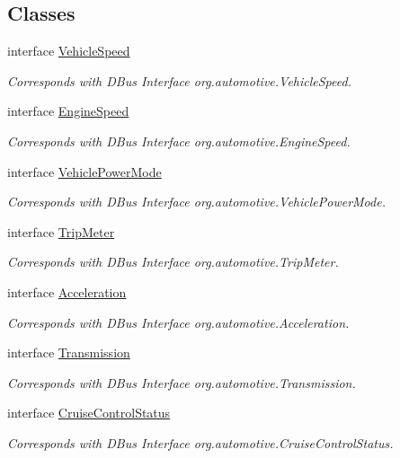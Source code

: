 \subsection*{Classes}
\begin{DoxyCompactItemize}
\item 
interface \hyperlink{interfaceVehicleSpeed}{Vehicle\+Speed}
\begin{DoxyCompactList}\small\item\em Corresponds with D\+Bus Interface org.\+automotive.\+Vehicle\+Speed. \end{DoxyCompactList}\item 
interface \hyperlink{interfaceEngineSpeed}{Engine\+Speed}
\begin{DoxyCompactList}\small\item\em Corresponds with D\+Bus Interface org.\+automotive.\+Engine\+Speed. \end{DoxyCompactList}\item 
interface \hyperlink{interfaceVehiclePowerMode}{Vehicle\+Power\+Mode}
\begin{DoxyCompactList}\small\item\em Corresponds with D\+Bus Interface org.\+automotive.\+Vehicle\+Power\+Mode. \end{DoxyCompactList}\item 
interface \hyperlink{interfaceTripMeter}{Trip\+Meter}
\begin{DoxyCompactList}\small\item\em Corresponds with D\+Bus Interface org.\+automotive.\+Trip\+Meter. \end{DoxyCompactList}\item 
interface \hyperlink{interfaceAcceleration}{Acceleration}
\begin{DoxyCompactList}\small\item\em Corresponds with D\+Bus Interface org.\+automotive.\+Acceleration. \end{DoxyCompactList}\item 
interface \hyperlink{interfaceTransmission}{Transmission}
\begin{DoxyCompactList}\small\item\em Corresponds with D\+Bus Interface org.\+automotive.\+Transmission. \end{DoxyCompactList}\item 
interface \hyperlink{interfaceCruiseControlStatus}{Cruise\+Control\+Status}
\begin{DoxyCompactList}\small\item\em Corresponds with D\+Bus Interface org.\+automotive.\+Cruise\+Control\+Status. \end{DoxyCompactList}\item 

\end{DoxyCompactItemize}
